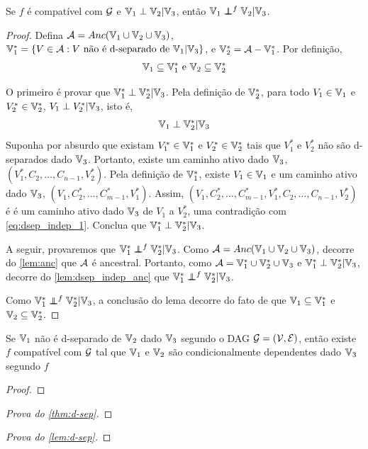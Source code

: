 \begin{lemma}
 \label{lem:dsep_indep}
 Se $f$ é compatível com ${\mathcal G}$ e
 ${\mathbb V}_1 \perp {\mathbb V}_2 | {\mathbb V}_3$, então
 ${\mathbb V}_1 \perp\!\!\!\!\perp^f {\mathbb V}_2 | {\mathbb V}_3$.
\end{lemma}

\begin{proof}
 Defina ${\mathcal A} = Anc({\mathbb V}_1 \cup {\mathbb V}_2 \cup {\mathbb V}_3)$,
 ${\mathbb V}^*_1 = \{V \in {\mathcal A}: V \text{ não é d-separado de } {\mathbb V}_1 | {\mathbb V}_3\}$, e ${\mathbb V}^*_2 = {\mathcal A} - {\mathbb V}^*_1$.
 Por definição,
 \begin{align}
  \label{eq:dsep_indep_0}
  {\mathbb V}_1 \subseteq {\mathbb V}^*_1 \text{ e }
  {\mathbb V}_2 \subseteq {\mathbb V}^*_2
 \end{align}

 O primeiro é provar que
 ${\mathbb V}^*_1 \perp {\mathbb V}^*_2 | {\mathbb V}_3$.
 Pela definição de ${\mathbb V}^*_2$, 
 para todo $V_1 \in {\mathbb V}_1$ e $V^*_2 \in {\mathbb V}^*_2$, 
 $V_1 \perp V^*_2 | {\mathbb V}_3$, isto é,
\begin{align}
 \label{eq:dsep_indep_1}
 {\mathbb V}_1 \perp {\mathbb V}^*_2 | {\mathbb V}_3
\end{align}
 Suponha por absurdo que existam
 $V^*_1 \in {\mathbb V}^*_1$ e $V^*_2 \in {\mathbb V}^*_2$
 tais que $V^*_1$ e $V^*_2$ 
 não são d-separados dado ${\mathbb V}_3$.
 Portanto, existe um caminho ativo dado ${\mathbb V}_3$,
 $(V^*_1,C_2,\ldots,C_{n-1},V^*_2)$.
 Pela definição de ${\mathbb V}^*_1$, existe
 $V_1 \in {\mathbb V}_1$ e um caminho ativo dado ${\mathbb V}_3$,
 $(V_1,C^*_2,\ldots,C^*_{m-1},V^*_1)$. Assim,
 $(V_1,C^*_2,\ldots,C^*_{m-1},
 V^*_1,C_2,\ldots,C_{n-1},V^*_2)$ é
 é um caminho ativo dado ${\mathbb V}_3$ de
 $V_1$ a $V^*_2$, uma contradição com
 \cref{eq:dsep_indep_1}. Conclua que
 ${\mathbb V}^*_1 \perp {\mathbb V}^*_2 | {\mathbb V}_3$.

 A seguir, provaremos que
 ${\mathbb V}^*_1 \perp\!\!\!\!\perp^f {\mathbb V}^*_2 | {\mathbb V}_3$.
 Como ${\mathcal A} = Anc({\mathbb V}_1 \cup {\mathbb V}_2 \cup {\mathbb V}_3)$,
 decorre do \cref{lem:anc} que
 ${\mathcal A}$ é ancestral. Portanto, como
 ${\mathcal A} = {\mathbb V}^*_1 \cup {\mathbb V}^*_2 \cup {\mathbb V}_3$ e
 ${\mathbb V}^*_1 \perp {\mathbb V}^*_2 | {\mathbb V}_3$, decorre do
 \cref{lem:dsep_indep_anc} que
 ${\mathbb V}^*_1 \perp\!\!\!\!\perp^f {\mathbb V}^*_2 | {\mathbb V}_3$.

Como ${\mathbb V}^*_1 \perp\!\!\!\!\perp^f {\mathbb V}^*_2 | {\mathbb V}_3$,
 a conclusão do lema decorre do fato de que
 ${\mathbb V}_1 \subseteq {\mathbb V}^*_1$ e 
 ${\mathbb V}_2 \subseteq {\mathbb V}^*_2$. 
\end{proof}

\begin{lemma}
 \label{lemma:d-sep-volta}
 Se ${\mathbb V}_1$ não é d-separado de ${\mathbb V}_2$
 dado ${\mathbb V}_3$ segundo o DAG ${\mathcal G} = ({\mathcal V}, {\mathcal E})$, então
 existe $f$ compatível com ${\mathcal G}$ tal que
 ${\mathbb V}_1$ e ${\mathbb V}_2$ são condicionalmente dependentes
 dado ${\mathbb V}_3$ segundo $f$
\end{lemma}

\begin{proof}
\end{proof}

\begin{proof}[Prova do \cref{thm:d-sep}]
\end{proof}

\begin{proof}[Prova do \cref{lem:d-sep}]
\end{proof}


